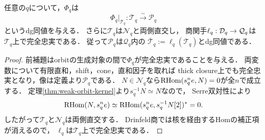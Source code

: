 \begin{theorem}\label{thm:orbit-core-equivalence}
任意の$q$について，$\Phi_q$は
\[
\boxed{\Phi_q|_{\mathcal T_q}:\mathcal T_q
  \xrightarrow{\sim}\mathcal P_q}
\]
というdg同値を与える．
さらに$\mathcal T_q$は$\mathcal N_q$と両側直交し，
商関手$\ell_q:\mathcal D_q\to\mathcal Q_q$は$\mathcal T_q$上で完全忠実である．
従って$\mathcal P_q$は$\mathcal Q_q$内の
$\overline{\mathcal T}_q:=\ell_q(\mathcal T_q)$とdg同値である．
\end{theorem}
\begin{proof}
前補題はorbitの生成対象の間で$\Phi_q$が完全忠実であることを与える．
両変数について有限直和，shift，cone，直和因子を取れば
thick closure上でも完全忠実となり，像は定義より$\mathcal P_q$である．
$N\in\mathcal N_q$なら$\operatorname{RHom}(s_q^ne,N)=0$が全$n$で成立する．
定理\ref{thm:weak-orbit-kernel}より$s_q^{-1}N\simeq N$なので，
Serre双対性により
\[
 \operatorname{RHom}(N,s_q^ne)
 \simeq\operatorname{RHom}(s_q^ne,s_q^{-1}N[2])^{*}=0.
\]
したがって$\mathcal T_q$と$\mathcal N_q$は両側直交する．
Drinfeld商では核を経由するHomの補正項が消えるので，
$\ell_q$は$\mathcal T_q$上で完全忠実である．
\end{proof}

